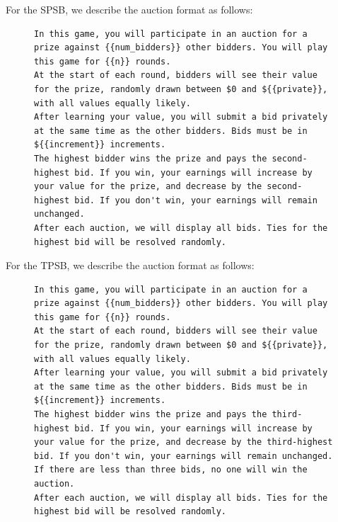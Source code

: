 \documentclass[acmsmall,screen,review]{acmart}
\begin{document}
For the SPSB, we describe the auction format as follows:
\begin{figure}
\centering
\begin{minipage}{0.95\textwidth}
\begin{lstlisting}
In this game, you will participate in an auction for a prize against {{num_bidders}} other bidders. You will play this game for {{n}} rounds.
At the start of each round, bidders will see their value for the prize, randomly drawn between $0 and ${{private}}, with all values equally likely.
After learning your value, you will submit a bid privately at the same time as the other bidders. Bids must be in ${{increment}} increments.
The highest bidder wins the prize and pays the second-highest bid. If you win, your earnings will increase by your value for the prize, and decrease by the second-highest bid. If you don't win, your earnings will remain unchanged.
After each auction, we will display all bids. Ties for the highest bid will be resolved randomly.
\end{lstlisting}
\end{minipage}
\label{fig:sealbid_prompt-2}
\end{figure}


For the TPSB, we describe the auction format as follows:
\begin{figure}
\centering
\begin{minipage}{0.95\textwidth}
\begin{lstlisting}
In this game, you will participate in an auction for a prize against {{num_bidders}} other bidders. You will play this game for {{n}} rounds.
At the start of each round, bidders will see their value for the prize, randomly drawn between $0 and ${{private}}, with all values equally likely.
After learning your value, you will submit a bid privately at the same time as the other bidders. Bids must be in ${{increment}} increments.
The highest bidder wins the prize and pays the third-highest bid. If you win, your earnings will increase by your value for the prize, and decrease by the third-highest bid. If you don't win, your earnings will remain unchanged. If there are less than three bids, no one will win the auction.
After each auction, we will display all bids. Ties for the highest bid will be resolved randomly.
\end{lstlisting}
\end{minipage}
\label{fig:sealbid_prompt-3}
\end{figure}
\end{document}
